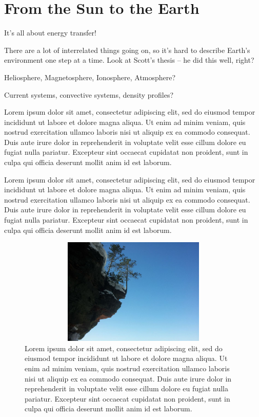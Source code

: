 
\chapter{From the Sun to the Earth}
\label{intro_chapter}

It's all about energy transfer! 

There are a lot of interrelated things going on, so it's hard to describe Earth's environment one step at a time. Look at Scott's thesis -- he did this well, right? 

Heliosphere, Magnetosphere, Ionosphere, Atmosphere?

Current systems, convective systems, density profiles? 

Lorem ipsum dolor sit amet, consectetur adipiscing elit, sed do eiusmod tempor incididunt ut labore et dolore magna aliqua. Ut enim ad minim veniam, quis nostrud exercitation ullamco laboris nisi ut aliquip ex ea commodo consequat. Duis aute irure dolor in reprehenderit in voluptate velit esse cillum dolore eu fugiat nulla pariatur. Excepteur sint occaecat cupidatat non proident, sunt in culpa qui officia deserunt mollit anim id est laborum.

Lorem ipsum dolor sit amet, consectetur adipiscing elit, sed do eiusmod tempor incididunt ut labore et dolore magna aliqua. Ut enim ad minim veniam, quis nostrud exercitation ullamco laboris nisi ut aliquip ex ea commodo consequat. Duis aute irure dolor in reprehenderit in voluptate velit esse cillum dolore eu fugiat nulla pariatur. Excepteur sint occaecat cupidatat non proident, sunt in culpa qui officia deserunt mollit anim id est laborum.
\begin{figure}
  \includegraphics[width=5.75in, height=2in]{figures/image.jpg}
  \caption{Lorem ipsum dolor sit amet, consectetur adipiscing elit, sed do eiusmod tempor incididunt ut labore et dolore magna aliqua. Ut enim ad minim veniam, quis nostrud exercitation ullamco laboris nisi ut aliquip ex ea commodo consequat. Duis aute irure dolor in reprehenderit in voluptate velit esse cillum dolore eu fugiat nulla pariatur. Excepteur sint occaecat cupidatat non proident, sunt in culpa qui officia deserunt mollit anim id est laborum. }
  \label{image}
\end{figure}

